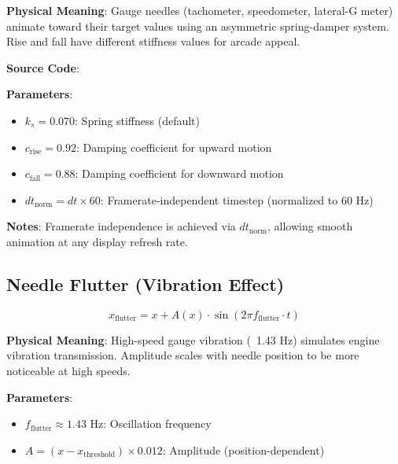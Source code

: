 \textbf{Physical Meaning}: Gauge needles (tachometer, speedometer, lateral-G meter) animate toward their target values using an asymmetric spring-damper system. Rise and fall have different stiffness values for arcade appeal.

\textbf{Source Code}: 

\textbf{Parameters}:
\begin{itemize}
  \item $k_s = 0.070$: Spring stiffness (default)
  \item $c_{\text{rise}} = 0.92$: Damping coefficient for upward motion
  \item $c_{\text{fall}} = 0.88$: Damping coefficient for downward motion
  \item $dt_{\text{norm}} = dt \times 60$: Framerate-independent timestep (normalized to 60 Hz)
\end{itemize}

\textbf{Notes}: Framerate independence is achieved via $dt_{\text{norm}}$, allowing smooth animation at any display refresh rate.

\subsection{Needle Flutter (Vibration Effect)}

\begin{equation}
  x_{\text{flutter}} = x + A(x) \cdot \sin(2\pi f_{\text{flutter}} \cdot t)
  \label{eq:needle-flutter}
\end{equation}

\textbf{Physical Meaning}: High-speed gauge vibration (~1.43 Hz) simulates engine vibration transmission. Amplitude scales with needle position to be more noticeable at high speeds.

\textbf{Parameters}:
\begin{itemize}
  \item $f_{\text{flutter}} \approx 1.43$ Hz: Oscillation frequency
  \item $A = (x - x_{\text{threshold}}) \times 0.012$: Amplitude (position-dependent)
\end{itemize}

\newpage
